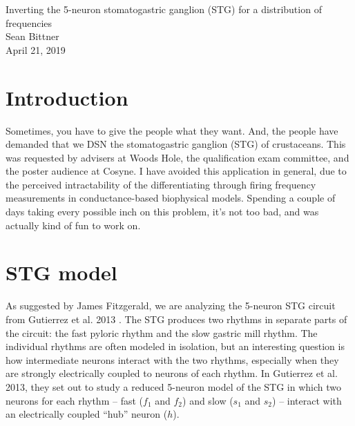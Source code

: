 \documentclass[11pt]{article}
\begin{document}
\medskip                        %

\thispagestyle{plain}
\begin{center}                  %
{\Large Inverting the 5-neuron stomatogastric ganglion (STG) for a distribution of frequencies} \\
Sean Bittner \\
April 21, 2019 \\
\end{center}

\section{Introduction}

Sometimes, you have to give the people what they want.  And, the people have demanded that we DSN the stomatogastric ganglion (STG) of crustaceans.  This was requested by advisers at Woods Hole, the qualification exam committee, and the poster audience at Cosyne.  I have avoided this application in general, due to the perceived intractability of the differentiating through firing frequency measurements in conductance-based biophysical models.  Spending a couple of days taking every possible inch on this problem, it's not too bad, and was actually kind of fun to work on.

\section{STG model}
As suggested by James Fitzgerald, we are analyzing the 5-neuron STG circuit from Gutierrez et al. 2013 \cite{gutierrez2013multiple}.  The STG produces two rhythms in separate parts of the circuit: the fast pyloric rhythm and the slow gastric mill rhythm.  The individual rhythms are often modeled in isolation, but an interesting question is how intermediate neurons interact with the two rhythms, especially when they are strongly electrically coupled to neurons of each rhythm.  In Gutierrez et al. 2013, they set out to study a reduced 5-neuron model of the STG in which two neurons for each rhythm – fast ($f_1$ and $f_2$) and slow ($s_1$ and $s_2$) – interact with an electrically coupled “hub” neuron ($h$).  
\end{document}
